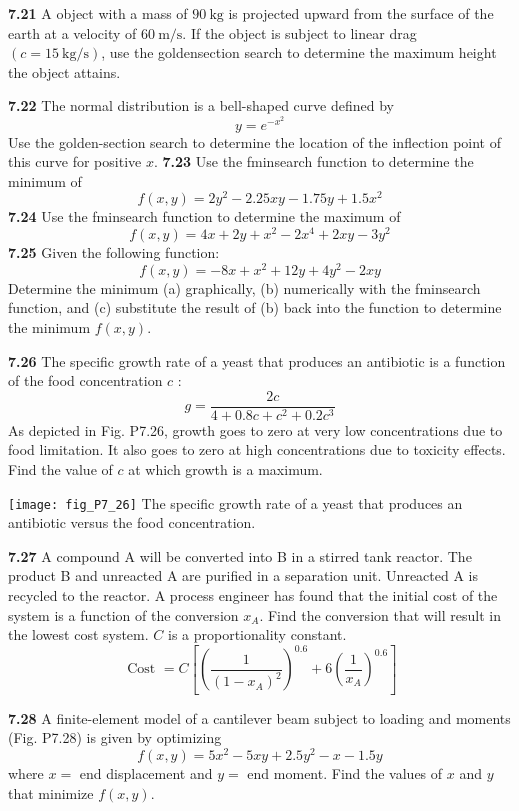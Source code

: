 \documentclass[../main.tex]{subfiles}
\begin{document}
\begin{multicols}{2}
	\noindent \textbf{7.21} A object with a mass of $90 \mathrm{~kg}$ is projected upward from the surface of the earth at a velocity of $60 \mathrm{~m} / \mathrm{s}$. If the object is subject to linear drag $(c=15 \mathrm{~kg} / \mathrm{s})$, use the goldensection search to determine the maximum height the object attains.

	\noindent \textbf{7.22} The normal distribution is a bell-shaped curve defined by
	$$
	y=e^{-x^{2}}
	$$
	Use the golden-section search to determine the location of the inflection point of this curve for positive $x$.
	\noindent \textbf{7.23} Use the fminsearch function to determine the minimum of
	$$
	f(x, y)=2 y^{2}-2.25 x y-1.75 y+1.5 x^{2}
	$$
	\noindent \textbf{7.24} Use the fminsearch function to determine the maximum of
	$$
	f(x, y)=4 x+2 y+x^{2}-2 x^{4}+2 x y-3 y^{2}
	$$
	\noindent \textbf{7.25} Given the following function:
	$$
	f(x, y)=-8 x+x^{2}+12 y+4 y^{2}-2 x y
	$$
	Determine the minimum (a) graphically, (b) numerically with the fminsearch function, and (c) substitute the result of (b) back into the function to determine the minimum $f(x, y)$.
	
	\noindent \textbf{7.26} The specific growth rate of a yeast that produces an antibiotic is a function of the food concentration $c$ :
	$$
	g=\frac{2 c}{4+0.8 c+c^{2}+0.2 c^{3}}
	$$
	As depicted in Fig. P7.26, growth goes to zero at very low concentrations due to food limitation. It also goes to zero at high concentrations due to toxicity effects. Find the value of $c$ at which growth is a maximum.
	
	\begin{center}
	\texttt{[image: fig\_P7\_26]}
	\textsf{The specific growth rate of a yeast that produces an
	antibiotic versus the food concentration.}
	\end{center}

	\noindent \textbf{7.27} A compound A will be converted into B in a stirred tank reactor. The product B and unreacted A are purified in a separation unit. Unreacted $\mathrm{A}$ is recycled to the reactor. A process engineer has found that the initial cost of the system is a function of the conversion $x_{A}$. Find the conversion that will result in the lowest cost system. $C$ is a proportionality constant.
	$$
	\text { Cost }=C\left[\left(\frac{1}{\left(1-x_{A}\right)^{2}}\right)^{0.6}+6\left(\frac{1}{x_{A}}\right)^{0.6}\right]
	$$
	\newpage

	\noindent \textbf{7.28} A finite-element model of a cantilever beam subject to loading and moments (Fig. P7.28) is given by optimizing
	$$
	f(x, y)=5 x^{2}-5 x y+2.5 y^{2}-x-1.5 y
	$$
	where $x=$ end displacement and $y=$ end moment. Find the values of $x$ and $y$ that minimize $f(x, y)$.
	

\end{multicols}
\end{document}
